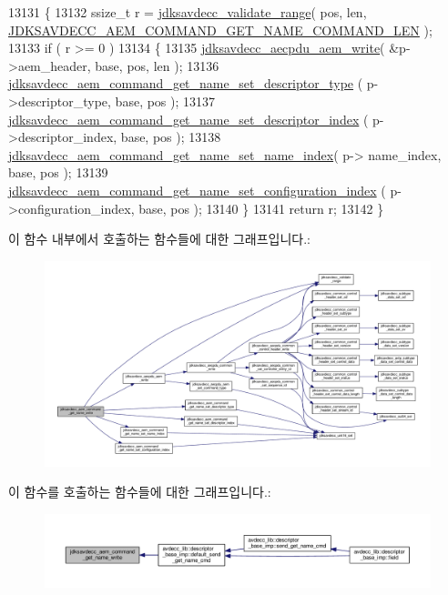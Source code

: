 \begin{DoxyCode}
13131 \{
13132     ssize\_t r = \hyperlink{group__util_ga9c02bdfe76c69163647c3196db7a73a1}{jdksavdecc\_validate\_range}( pos, len, 
      \hyperlink{group__command__get__name_ga12d8b1a1daf6c9b805a6d84f5ecf92cb}{JDKSAVDECC\_AEM\_COMMAND\_GET\_NAME\_COMMAND\_LEN} );
13133     \textcolor{keywordflow}{if} ( r >= 0 )
13134     \{
13135         \hyperlink{group__aecpdu__aem_gad658e55771cce77cecf7aae91e1dcbc5}{jdksavdecc\_aecpdu\_aem\_write}( &p->aem\_header, base, pos, len );
13136         \hyperlink{group__command__get__name_gadab984a13902ca7a500337c5dff72316}{jdksavdecc\_aem\_command\_get\_name\_set\_descriptor\_type}
      ( p->descriptor\_type, base, pos );
13137         \hyperlink{group__command__get__name_ga50c21d5e5e65361be4a6075540e4fab5}{jdksavdecc\_aem\_command\_get\_name\_set\_descriptor\_index}
      ( p->descriptor\_index, base, pos );
13138         \hyperlink{group__command__get__name_ga88cd11ff53744a1cef316a2bf9975ab1}{jdksavdecc\_aem\_command\_get\_name\_set\_name\_index}( p->
      name\_index, base, pos );
13139         \hyperlink{group__command__get__name_gab89c9273046ceb4ccff130c3416e414f}{jdksavdecc\_aem\_command\_get\_name\_set\_configuration\_index}
      ( p->configuration\_index, base, pos );
13140     \}
13141     \textcolor{keywordflow}{return} r;
13142 \}
\end{DoxyCode}


이 함수 내부에서 호출하는 함수들에 대한 그래프입니다.\+:
\nopagebreak
\begin{figure}[H]
\begin{center}
\leavevmode
\includegraphics[width=350pt]{group__command__get__name_ga61f178bb903a33dc13e23c5e55e2d89d_cgraph}
\end{center}
\end{figure}




이 함수를 호출하는 함수들에 대한 그래프입니다.\+:
\nopagebreak
\begin{figure}[H]
\begin{center}
\leavevmode
\includegraphics[width=350pt]{group__command__get__name_ga61f178bb903a33dc13e23c5e55e2d89d_icgraph}
\end{center}
\end{figure}


